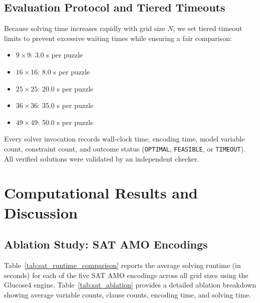 \documentclass[a4paper,fleqn]{cas-sc}
\begin{document}
\subsection{Evaluation Protocol and Tiered Timeouts}
Because solving time increases rapidly with grid size $N$, we set tiered timeout limits to prevent excessive waiting times while ensuring a fair comparison:
\begin{itemize}
    \item $9 \times 9$: 3.0 s per puzzle
    \item $16 \times 16$: 8.0 s per puzzle
    \item $25 \times 25$: 20.0 s per puzzle
    \item $36 \times 36$: 35.0 s per puzzle
    \item $49 \times 49$: 50.0 s per puzzle
\end{itemize}
Every solver invocation records wall-clock time, encoding time, model variable count, constraint count, and outcome status (\texttt{OPTIMAL}, \texttt{FEASIBLE}, or \texttt{TIMEOUT}). All verified solutions were validated by an independent checker.

\section{Computational Results and Discussion}
\label{sec:results}

\subsection{Ablation Study: SAT AMO Encodings}
Table~\ref{tab:sat_runtime_comparison} reports the average solving runtime (in seconds) for each of the five SAT AMO encodings across all grid sizes using the Glucose4 engine. Table~\ref{tab:sat_ablation} provides a detailed ablation breakdown showing average variable counts, clause counts, encoding time, and solving time.
\end{document}
